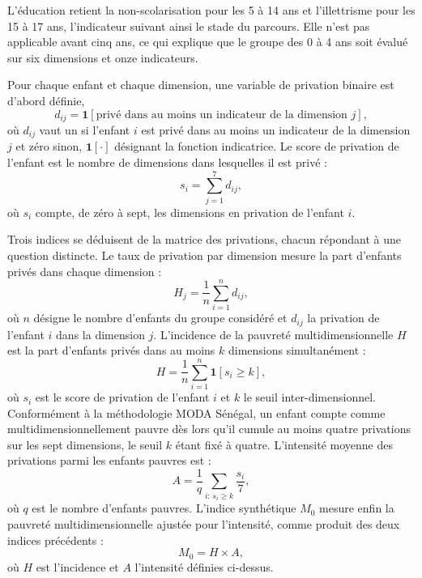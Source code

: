 L'éducation retient la non-scolarisation pour les 5 à 14 ans et
l'illettrisme pour les 15 à 17 ans, l'indicateur suivant ainsi le stade du
parcours. Elle n'est pas applicable avant cinq ans, ce qui explique que le
groupe des 0 à 4 ans soit évalué sur six dimensions et onze indicateurs.

Pour chaque enfant et chaque dimension, une variable de privation binaire
est d'abord définie,
\begin{equation}
  d_{ij} = \mathbf{1}\left[\text{privé dans au moins un indicateur de la
  dimension } j\right],
  \label{eq:dij}
\end{equation}
où $d_{ij}$ vaut un si l'enfant $i$ est privé dans au moins un indicateur
de la dimension $j$ et zéro sinon, $\mathbf{1}[\cdot]$ désignant la
fonction indicatrice. Le score de privation
de l'enfant est le nombre de dimensions dans lesquelles il est privé :
\begin{equation}
  s_i = \sum_{j=1}^{7} d_{ij},
  \label{eq:score_moda}
\end{equation}
où $s_i$ compte, de zéro à sept, les dimensions en privation de
l'enfant $i$.

Trois indices se déduisent de la matrice des privations, chacun répondant
à une question distincte. Le taux de privation par dimension mesure la part d'enfants privés dans
chaque dimension :
\begin{equation}
  H_j = \frac{1}{n} \sum_{i=1}^{n} d_{ij},
  \label{eq:hj}
\end{equation}
où $n$ désigne le nombre d'enfants du groupe considéré et $d_{ij}$ la
privation de l'enfant $i$ dans la dimension $j$. L'incidence de la pauvreté multidimensionnelle $H$ est la part
d'enfants privés dans au moins $k$ dimensions simultanément :
\begin{equation}
  H = \frac{1}{n} \sum_{i=1}^{n} \mathbf{1}\left[s_i \geq k\right],
  \label{eq:pk}
\end{equation}
où $s_i$ est le score de privation de l'enfant $i$ et $k$ le seuil
inter-dimensionnel. Conformément à la méthodologie MODA Sénégal, un enfant compte comme
multidimensionnellement pauvre dès lors qu'il
cumule au moins quatre privations sur les sept dimensions, le seuil $k$ étant fixé à quatre.
L'intensité moyenne des privations parmi les enfants pauvres est :
\begin{equation}
  A = \frac{1}{q} \sum_{i:\,s_i \geq k} \frac{s_i}{7},
  \label{eq:intensite_moda}
\end{equation}
où $q$ est le nombre d'enfants pauvres. L'indice synthétique $M_0$
mesure enfin la pauvreté multidimensionnelle ajustée pour l'intensité,
comme produit des deux indices précédents :
\begin{equation}
  M_0 = H \times A,
  \label{eq:m0}
\end{equation}
où $H$ est l'incidence et $A$ l'intensité définies ci-dessus.

